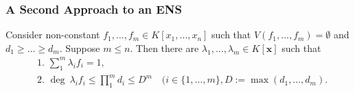    \subsubsection{A Second Approach to an ENS}
    \begin{theorem}
        Consider non-constant $f_1,\dots,f_m\in K[x_1,\dots,x_n]$ such that $V(f_1,\dots,f_m)=\emptyset$ and $d_1\geq \dots\geq d_m$. Suppose $m\leq n$. Then there are $\lambda_1,\dots,\lambda_m \in K[\mathbf{x}]$ such that 
        \begin{align*}
            &\text{1. } \sum_1^m \lambda_if_i= 1,\\
            &\text{2. } \deg \ \lambda_if_i \leq \prod_1^m d_i\leq D^m \quad (i\in\{1,\dots,m\}, D:= \max(d_1,\dots,d_m).
        \end{align*}
    \end{theorem}
